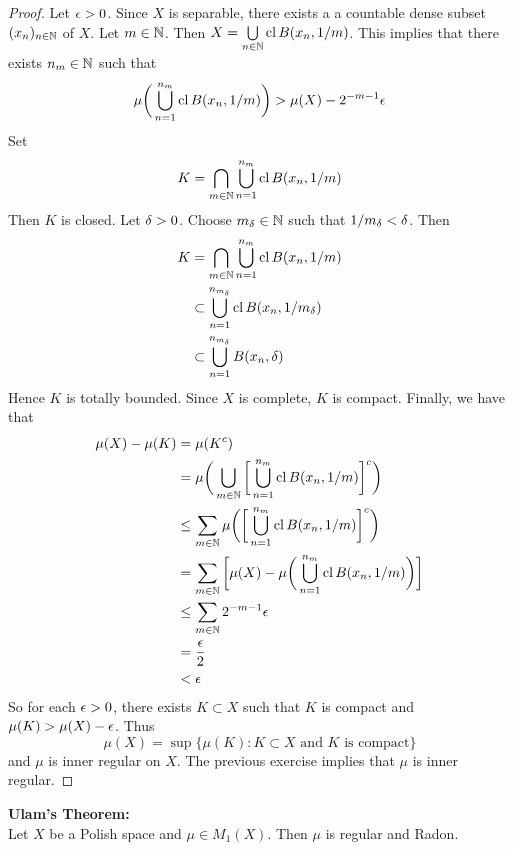 \documentclass{book}
\begin{document}
	\begin{proof}
		Let $\epsilon >0$. Since $X$ is separable, there exists a a countable dense subset $(x_{n})_{n \in \mathbb{N}}$ of $X$. Let $m \in \mathbb{N}$. Then $X = \bigcup\limits_{n \in \mathbb{N}} \operatorname{cl} B(x_n, 1/m)$. This implies that there exists $n_m \in \mathbb{N}$ such that 
		$$\mu \bigg(\bigcup\limits_{n = 1}^{n_m} \operatorname{cl} B(x_n, 1/m) \bigg) > \mu(X) - 2^{-m-1}\epsilon$$ 
		Set 
		$$K = \bigcap\limits_{m \in \mathbb{N}} \bigcup\limits_{n = 1}^{n_m} \operatorname{cl} B(x_n, 1/m) $$
		Then $K$ is closed. Let $\delta >0$. Choose $m_{\delta} \in \mathbb{N}$ such that $1/m_{\delta} < \delta$. Then 
		\begin{align*}
			K 
			&=  \bigcap\limits_{m \in \mathbb{N}} \bigcup\limits_{n = 1}^{n_m} \operatorname{cl} B(x_n, 1/m) \\
			& \subset \bigcup\limits_{n = 1}^{n_{m_{\delta}}} \operatorname{cl} B(x_n, 1/{m_{\delta}}) \\
			& \subset  \bigcup\limits_{n = 1}^{n_{m_{\delta}}} B(x_n, \delta) \\ 
		\end{align*}
		Hence $K$ is totally bounded. Since $X$ is complete, $K$ is compact. Finally, we have that 
		\begin{align*}
			\mu(X) - \mu(K)
			&= \mu(K^c) \\
			&= \mu \bigg( \bigcup\limits_{m \in \mathbb{N}} \bigg[ \bigcup\limits_{n = 1}^{n_m} \operatorname{cl} B(x_n, 1/m) \bigg]^c  \bigg) \\
			&\leq \sum\limits_{m \in \mathbb{N}} \mu \bigg( \bigg[ \bigcup\limits_{n = 1}^{n_m} \operatorname{cl} B(x_n, 1/m) \bigg]^c \bigg) \\
			&= \sum\limits_{m \in \mathbb{N}} \bigg[ \mu(X) - \mu \bigg(  \bigcup\limits_{n = 1}^{n_m} \operatorname{cl} B(x_n, 1/m)  \bigg) \bigg] \\
			& \leq \sum\limits_{m \in \mathbb{N}} 2^{-m-1}\epsilon \\
			&= \frac{\epsilon}{2} \\
			&< \epsilon
		\end{align*} 
		So for each $\epsilon >0$, there exists $K \subset X$ such that $K$ is compact and $\mu(K) > \mu(X) - \epsilon$. Thus $$\mu(X) = \sup\{\mu(K): \text{$K \subset X$ and $K$ is compact}\}$$ and $\mu$ is inner regular on $X$. The previous exercise implies that $\mu$ is inner regular.   
	\end{proof}
	
	\begin{ex}  \textbf{Ulam's Theorem:} \\
		Let $X$ be a Polish space and $\mu \in M_1(X)$. Then $\mu$ is regular and Radon.
	\end{ex}
	
\end{document}
